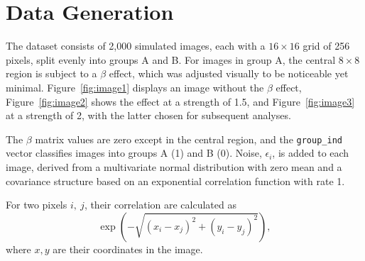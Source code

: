 \documentclass[12pt]{article}
\begin{document}
\section*{Data Generation}

The dataset consists of 2,000 simulated images, each with a \(16 \times 16\) grid of 256 pixels, split evenly into groups A and B. For images in group A, the central \(8 \times 8\) region is subject to a \(\beta\) effect, which was adjusted visually to be noticeable yet minimal. Figure~\ref{fig:image1} displays an image without the \(\beta\) effect, Figure~\ref{fig:image2} shows the effect at a strength of 1.5, and Figure~\ref{fig:image3} at a strength of 2, with the latter chosen for subsequent analyses.

The \(\beta\) matrix values are zero except in the central region, and the \texttt{group\_ind} vector classifies images into groups A (1) and B (0). Noise, \(\epsilon_i\), is added to each image, derived from a multivariate normal distribution with zero mean and a covariance structure based on an exponential correlation function with rate 1.

For two pixels \(i, \ j\), their correlation are calculated as
\[
    \exp \left(- \sqrt{(x_i - x_j)^2 + (y_i - y_j)^2}\right),
\]
where \(x, y\) are their coordinates in the image.


\end{document}
